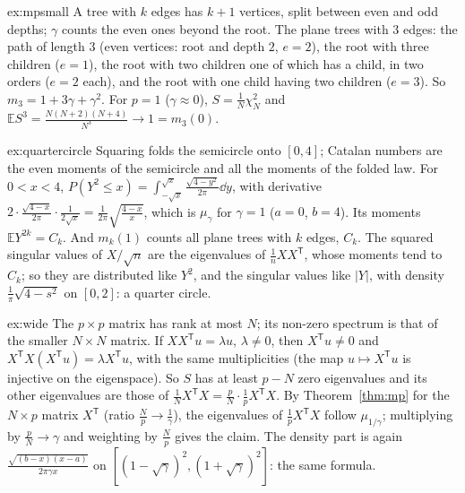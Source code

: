 \begin{solution}{ex:mpsmall}
\idea A tree with $k$ edges has $k+1$ vertices, split between even and odd depths; $\gamma$ counts the even ones beyond the root.
\writeup The plane trees with $3$ edges: the path of length $3$ (even vertices: root and depth $2$, $e=2$), the root with three children ($e=1$), the root with two children one of which has a child, in two orders ($e=2$ each), and
the root with one child having two children ($e=3$). So $m_3=1+3\gamma+\gamma^2$. For $p=1$ ($\gamma\approx0$), $S=\frac1N\chi^2_N$ and $\mathbb ES^3=\frac{N(N+2)(N+4)}{N^3}\to1=m_3(0)$.
\end{solution}

\begin{solution}{ex:quartercircle}
\idea Squaring folds the semicircle onto $[0,4]$; Catalan numbers are the even moments of the semicircle and all the moments of the folded law.
\writeup For $0<x<4$, $P(Y^2\le x)=\int_{-\sqrt x}^{\sqrt x}\frac{\sqrt{4-y^2}}{2\pi}\dd y$, with derivative $2\cdot\frac{\sqrt{4-x}}{2\pi}\cdot\frac1{2\sqrt x}=\frac1{2\pi}\sqrt{\frac{4-x}x}$, which is $\mu_\gamma$ for $\gamma=1$ ($a=0$, $b=4$). Its moments
$\mathbb EY^{2k}=C_k$. And $m_k(1)$ counts all plane trees with $k$ edges, $C_k$. The squared singular values of $X/\sqrt n$ are the eigenvalues of $\frac1nXX^{\mathsf T}$, whose moments tend to $C_k$; so they are distributed like
$Y^2$, and the singular values like $|Y|$, with density $\frac1\pi\sqrt{4-s^2}$ on $[0,2]$: a quarter circle.
\end{solution}

\begin{solution}{ex:wide}
\idea The $p\times p$ matrix has rank at most $N$; its non-zero spectrum is that of the smaller $N\times N$ matrix.
\writeup If $XX^{\mathsf T}u=\lambda u$, $\lambda\ne0$, then $X^{\mathsf T}u\ne0$ and $X^{\mathsf T}X(X^{\mathsf T}u)=\lambda X^{\mathsf T}u$, with the same multiplicities (the map $u\mapsto X^{\mathsf T}u$ is injective on the eigenspace). So $S$ has at least
$p-N$ zero eigenvalues and its other eigenvalues are those of $\frac1NX^{\mathsf T}X=\frac pN\cdot\frac1pX^{\mathsf T}X$. By Theorem~\ref{thm:mp} for the $N\times p$ matrix $X^{\mathsf T}$ (ratio $\frac Np\to\frac1\gamma$), the eigenvalues of
$\frac1pX^{\mathsf T}X$ follow $\mu_{1/\gamma}$; multiplying by $\frac pN\to\gamma$ and weighting by $\frac Np$ gives the claim. The density part is again $\frac{\sqrt{(b-x)(x-a)}}{2\pi\gamma x}$ on $[(1-\sqrt\gamma)^2,(1+\sqrt\gamma)^2]$: the same formula.
\end{solution}

